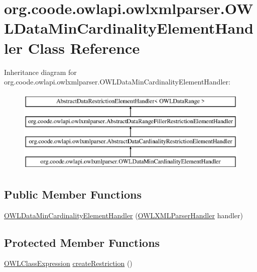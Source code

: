 \hypertarget{classorg_1_1coode_1_1owlapi_1_1owlxmlparser_1_1_o_w_l_data_min_cardinality_element_handler}{\section{org.\-coode.\-owlapi.\-owlxmlparser.\-O\-W\-L\-Data\-Min\-Cardinality\-Element\-Handler Class Reference}
\label{classorg_1_1coode_1_1owlapi_1_1owlxmlparser_1_1_o_w_l_data_min_cardinality_element_handler}
}
Inheritance diagram for org.\-coode.\-owlapi.\-owlxmlparser.\-O\-W\-L\-Data\-Min\-Cardinality\-Element\-Handler\-:\begin{figure}[H]
\begin{center}
\leavevmode
\includegraphics[height=4.000000cm]{classorg_1_1coode_1_1owlapi_1_1owlxmlparser_1_1_o_w_l_data_min_cardinality_element_handler}
\end{center}
\end{figure}
\subsection*{Public Member Functions}
\begin{DoxyCompactItemize}
\item 
\hyperlink{classorg_1_1coode_1_1owlapi_1_1owlxmlparser_1_1_o_w_l_data_min_cardinality_element_handler_ac43d471e3bc7f3a44b218c46d87e2389}{O\-W\-L\-Data\-Min\-Cardinality\-Element\-Handler} (\hyperlink{classorg_1_1coode_1_1owlapi_1_1owlxmlparser_1_1_o_w_l_x_m_l_parser_handler}{O\-W\-L\-X\-M\-L\-Parser\-Handler} handler)
\end{DoxyCompactItemize}
\subsection*{Protected Member Functions}
\begin{DoxyCompactItemize}
\item 
\hyperlink{interfaceorg_1_1semanticweb_1_1owlapi_1_1model_1_1_o_w_l_class_expression}{O\-W\-L\-Class\-Expression} \hyperlink{classorg_1_1coode_1_1owlapi_1_1owlxmlparser_1_1_o_w_l_data_min_cardinality_element_handler_aa197b45c1de726be7a21bad935c2a9c9}{create\-Restriction} ()
\end{DoxyCompactItemize}


